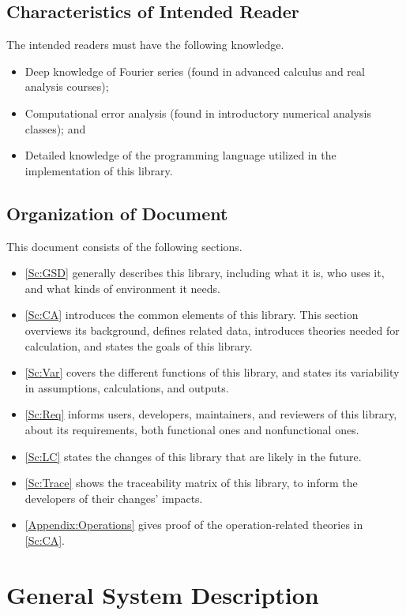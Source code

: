 \documentclass[12pt]{article}
\begin{document}
\subsection{Characteristics of Intended Reader} 
The intended readers must have the following knowledge.
\begin{itemize}
	\item Deep knowledge of Fourier series (found in advanced 
	calculus and real analysis courses);
	\item Computational error analysis (found in introductory numerical 
	analysis classes); and
	\item Detailed knowledge of the programming language utilized 
	in the implementation of this library.	
\end{itemize}

\subsection{Organization of Document}
This document consists of the following sections.
\begin{itemize}
	\item \autoref{Sc:GSD} generally describes this library, including 
	what it is, who uses it, and what kinds of environment it needs.
	\item \autoref{Sc:CA} introduces the common elements of this library. 
	This section overviews its background, defines related data, 
	introduces theories needed for calculation, 
	and states the goals of this library.
	\item \autoref{Sc:Var} covers the different functions of this library, 
	and states its variability in assumptions, calculations, and outputs.
	\item \autoref{Sc:Req} informs users, developers, maintainers, 
	and reviewers of this library, about its requirements, 
	both functional ones and nonfunctional ones.
	\item \autoref{Sc:LC} states the changes of this library that are 
	likely in the future.
	\item \autoref{Sc:Trace} shows the traceability matrix of this library, 
	to inform the developers of their changes' impacts.
	\item \autoref{Appendix:Operations} gives proof of the 
	operation-related theories in \autoref{Sc:CA}.
\end{itemize}

\section{General System Description}\label{Sc:GSD}
\end{document}
